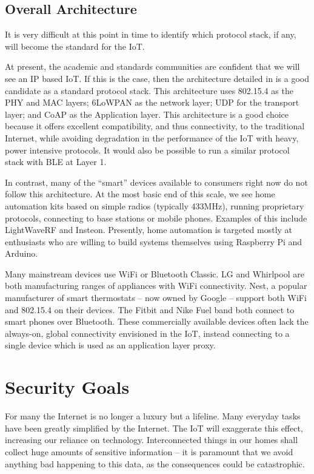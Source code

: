 \documentclass[10pt,journal,compsoc]{IEEEtran}
\begin{document}
\subsection{Overall Architecture}
It is very difficult at this point in time to identify which protocol stack, if
any, will become the standard for the IoT. 

At present, the academic and standards communities are confident that we will
see an IP based IoT. If this is the case, then the architecture detailed in
\cite{Palattella2013} is a good candidate as a standard protocol stack. This
architecture uses 802.15.4 as the PHY and MAC layers; 6LoWPAN as the network
layer; UDP for the transport layer; and CoAP as the Application layer. This
architecture is a good choice because it offers excellent compatibility, and
thus connectivity, to the traditional Internet, while avoiding degradation in
the performance of the IoT with heavy, power intensive protocols. It would also
be possible to run a similar protocol stack with BLE at Layer 1.  

In contrast, many of the ``smart'' devices available to consumers right now do
not follow this architecture. At the most basic end of this scale, we see home
automation kits based on simple radios (typically 433MHz), running proprietary
protocols, connecting to base stations or mobile phones. Examples of this
include LightWaveRF and Insteon. Presently, home automation is targeted mostly
at enthusiasts who are willing to build systems themselves using Raspberry Pi
and Arduino.  

Many mainstream devices use WiFi or Bluetooth Classic. LG and Whirlpool are
both manufacturing ranges of appliances with WiFi connectivity. Nest, a popular
manufacturer of smart thermostats -- now owned by Google -- support both WiFi
and 802.15.4 on their devices. The Fitbit and Nike Fuel band both connect to
smart phones over Bluetooth. These commercially available devices often lack
the always-on,  global connectivity envisioned in the IoT, instead connecting
to a single device which is used as an application layer proxy.


\section{Security Goals}
For many the Internet is no longer a luxury but a lifeline. Many everyday tasks
have been greatly simplified by the Internet. The IoT will exaggerate this
effect, increasing our reliance on technology. Interconnected things in our
homes shall collect huge amounts of sensitive information -- it is
paramount that we avoid anything bad happening to this data, as the
consequences could be catastrophic.
\end{document}
